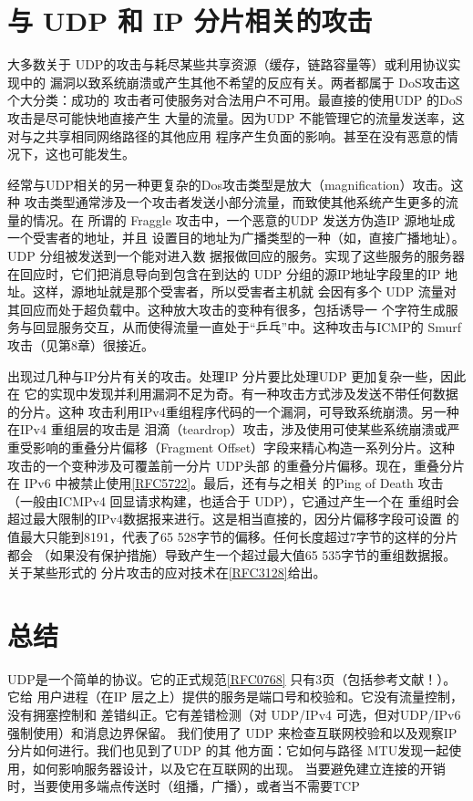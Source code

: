 \section{与 UDP 和 IP 分片相关的攻击}
大多数关于 UDP的攻击与耗尽某些共享资源（缓存，链路容量等）或利用协议实现中的
漏洞以致系统崩溃或产生其他不希望的反应有关。两者都属于 DoS攻击这个大分类：成功的
攻击者可使服务对合法用户不可用。最直接的使用UDP 的DoS攻击是尽可能快地直接产生
大量的流量。因为UDP 不能管理它的流量发送率，这对与之共享相同网络路径的其他应用
程序产生负面的影响。甚至在没有恶意的情况下，这也可能发生。

经常与UDP相关的另一种更复杂的Dos攻击类型是放大（magnification）攻击。这种
攻击类型通常涉及一个攻击者发送小部分流量，而致使其他系统产生更多的流量的情况。在
所谓的 Fraggle 攻击中，一个恶意的UDP 发送方伪造IP 源地址成一个受害者的地址，并且
设置目的地址为广播类型的一种（如，直接广播地址）。UDP 分组被发送到一个能对进入数
据报做回应的服务。实现了这些服务的服务器在回应时，它们把消息导向到包含在到达的
UDP 分组的源IP地址字段里的IP 地址。这样，源地址就是那个受害者，所以受害者主机就
会因有多个 UDP 流量对其回应而处于超负载中。这种放大攻击的变种有很多，包括诱导一
个字符生成服务与回显服务交互，从而使得流量一直处于“乒乓”中。这种攻击与ICMP的
Smurf 攻击（见第8章）很接近。

出现过几种与IP分片有关的攻击。处理IP 分片要比处理UDP 更加复杂一些，因此在
它的实现中发现并利用漏洞不足为奇。有一种攻击方式涉及发送不带任何数据的分片。这种
攻击利用IPv4重组程序代码的一个漏洞，可导致系统崩溃。另一种在IPv4 重组层的攻击是
泪滴（teardrop）攻击，涉及使用可使某些系统崩溃或严重受影响的重叠分片偏移（Fragment
Offset）字段来精心构造一系列分片。这种攻击的一个变种涉及可覆盖前一分片 UDP头部
的重叠分片偏移。现在，重叠分片在 IPv6 中被禁止使用\href{https://www.rfc-editor.org/rfc/rfc5722}{[RFC5722]}。最后，还有与之相关
的Ping of Death 攻击（一般由ICMPv4 回显请求构建，也适合于 UDP），它通过产生一个在
重组时会超过最大限制的IPv4数据报来进行。这是相当直接的，因分片偏移字段可设置
的值最大只能到8191，代表了65 528字节的偏移。任何长度超过7字节的这样的分片都会
（如果没有保护措施）导致产生一个超过最大值65 535字节的重组数据报。关于某些形式的
分片攻击的应对技术在\href{https://www.rfc-editor.org/rfc/rfc3128}{[RFC3128]}给出。

\section{总结}
UDP是一个简单的协议。它的正式规范\href{https://www.rfc-editor.org/rfc/rfc0768}{[RFC0768]} 只有3页（包括参考文献！）。它给
用户进程（在IP 层之上）提供的服务是端口号和校验和。它没有流量控制，没有拥塞控制和
差错纠正。它有差错检测（对 UDP/IPv4 可选，但对UDP/IPv6强制使用）和消息边界保留。
我们使用了 UDP 来检查互联网校验和以及观察IP 分片如何进行。我们也见到了UDP 的其
他方面：它如何与路径 MTU发现一起使用，如何影响服务器设计，以及它在互联网的出现。
当要避免建立连接的开销时，当要使用多端点传送时（组播，广播），或者当不需要TCP

